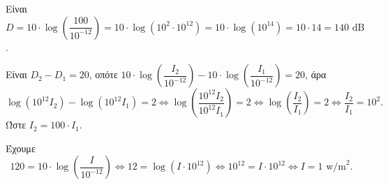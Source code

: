 \begin{alist}
\item Είναι $D = 10 \cdot \log\left(\dfrac{100}{10^{-12}}\right) = 10 \cdot \log(10^2 \cdot 10^{12}) = 10 \cdot \log(10^{14}) = 10 \cdot 14 = 140\text{ dB}$.
\item Είναι $D_2 - D_1 = 20$, οπότε $10 \cdot \log\left(\dfrac{I_2}{10^{-12}}\right) - 10 \cdot \log\left(\dfrac{I_1}{10^{-12}}\right) = 20$, άρα
\[\log(10^{12}I_2) - \log(10^{12}I_1) = 2 \Leftrightarrow \log\left(\frac{10^{12}I_2}{10^{12}I_1}\right) = 2 \Leftrightarrow \log\left(\frac{I_2}{I_1}\right) = 2 \Leftrightarrow \frac{I_2}{I_1} = 10^2.\]
Ώστε $I_2 = 100 \cdot I_1$.
\item Έχουμε 
\[120 = 10 \cdot \log\left(\frac{I}{10^{-12}}\right) \Leftrightarrow 12 = \log(I \cdot 10^{12}) \Leftrightarrow 10^{12} = I \cdot 10^{12} \Leftrightarrow I = 1\text{ w/m}^2.\]
\end{alist}

